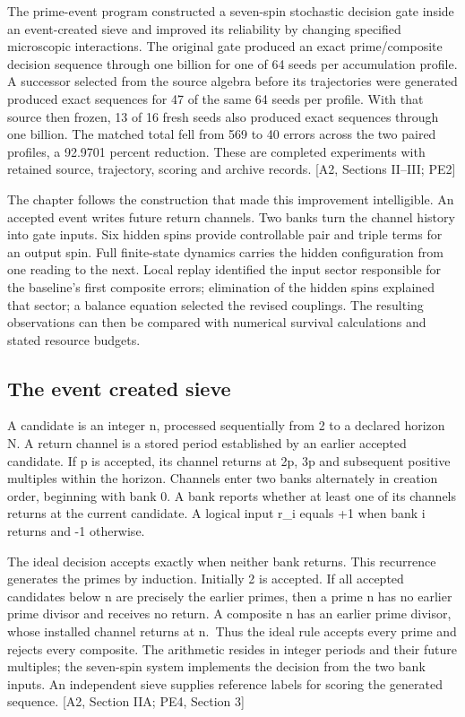 \label{prime-event-computation-and-microscopic-reliability}

The prime-event program constructed a seven-spin stochastic decision gate inside an event-created sieve and improved its reliability by changing specified microscopic interactions. The original gate produced an exact prime/composite decision sequence through one billion for one of 64 seeds per accumulation profile. A successor selected from the source algebra before its trajectories were generated produced exact sequences for 47 of the same 64 seeds per profile. With that source then frozen, 13 of 16 fresh seeds also produced exact sequences through one billion. The matched total fell from 569 to 40 errors across the two paired profiles, a 92.9701 percent reduction. These are completed experiments with retained source, trajectory, scoring and archive records. {[}A2, Sections II--III; PE2{]}

The chapter follows the construction that made this improvement intelligible. An accepted event writes future return channels. Two banks turn the channel history into gate inputs. Six hidden spins provide controllable pair and triple terms for an output spin. Full finite-state dynamics carries the hidden configuration from one reading to the next. Local replay identified the input sector responsible for the baseline's first composite errors; elimination of the hidden spins explained that sector; a balance equation selected the revised couplings. The resulting observations can then be compared with numerical survival calculations and stated resource budgets.

\subsection{The event created sieve}\label{the-event-created-sieve}

A candidate is an integer n, processed sequentially from 2 to a declared horizon N. A return channel is a stored period established by an earlier accepted candidate. If p is accepted, its channel returns at 2p, 3p and subsequent positive multiples within the horizon. Channels enter two banks alternately in creation order, beginning with bank 0. A bank reports whether at least one of its channels returns at the current candidate. A logical input r\_i equals +1 when bank i returns and -1 otherwise.

The ideal decision accepts exactly when neither bank returns. This recurrence generates the primes by induction. Initially 2 is accepted. If all accepted candidates below n are precisely the earlier primes, then a prime n has no earlier prime divisor and receives no return. A composite n has an earlier prime divisor, whose installed channel returns at n.~Thus the ideal rule accepts every prime and rejects every composite. The arithmetic resides in integer periods and their future multiples; the seven-spin system implements the decision from the two bank inputs. An independent sieve supplies reference labels for scoring the generated sequence. {[}A2, Section IIA; PE4, Section 3{]}

